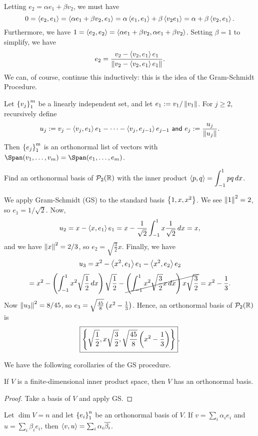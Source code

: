 \documentclass{article}
\begin{document}
Letting $e_2 =\alpha e_1+\beta v_2$, we must have
$$0 = \left\langle e_2, e_1\right\rangle = \left\langle\alpha e_1 + \beta v_2, e_1\right\rangle = \alpha\left\langle e_1, e_1\right\rangle + \beta\left\langle v_2 e_1\right\rangle = \alpha + \beta\left\langle v_2, e_1\right\rangle.$$
Furthermore, we have $1 = \left\langle e_2, e_2\right\rangle = \left\langle\alpha e_1 + \beta v_2, \alpha e_1 + \beta v_2\right\rangle$. Setting $\beta = 1$ to simplify, we have
$$e_2 = \frac{v_2 - \left\langle v_2, e_1\right\rangle e_1}{\left\Vert v_2 - \left\langle v_2, e_1\right\rangle e_1\right\Vert}.$$
We can, of course, continue this inductively: this is the idea of the Gram-Schmidt Procedure. \newpage
\begin{theorem}
Let $\left\{v_j\right\}_1^m$ be a linearly independent set, and let $e_1 := v_1/\left\Vert v_1\right\Vert$. For $j\geq 2$, recursively define
$$u_j := v_j - \left\langle v_j, e_1\right\rangle e_1 - \cdots - \left\langle v_j, e_{j-1}\right\rangle e_{j-1} \textsf{ and } e_j := \frac{u_j}{\left\Vert u_j\right\Vert}.$$
Then $\left\{e_j\right\}_1^m$ is an orthonormal list of vectors with $\Span(v_1, \ldots, v_m) = \Span(e_1, \ldots, e_m)$.
\end{theorem}
\begin{example}
Find an orthonormal basis of $\mathcal P_2(\mathbb R)$ with the inner product $\left\langle p,q\right\rangle = \displaystyle\int_{-1}^1 pq \,dx$.
\end{example}
\begin{solution}
We apply Gram-Schmidt (GS) to the standard basis $\left\{1, x, x^2\right\}$. We see $\left\Vert 1\right\Vert^2 = 2$, so $e_1 = 1/\sqrt 2$. Now,
$$u_2 = x - \left\langle x, e_1\right\rangle e_1 = x - \frac 1{\sqrt 2}\int_{-1}^1 x\frac 1{\sqrt 2}\, dx = x,$$
and we have $\left\Vert x\right\Vert^2 = 2/3$, so $e_2 = \sqrt{\frac 32}x$. Finally, we have
$$u_3 =x^2 - \left\langle x^2, e_1\right\rangle e_1 - \left\langle x^2, e_2\right\rangle e_2$$
$$=x^2 - \left(\int_{-1}^1 x^2\sqrt{\frac 12}\, dx \right) \sqrt{\frac 12} - \cancel{\left(\int_{-1}^1x^2 \sqrt{\frac 32}x \, dx \right) x\sqrt{\frac 32}} = x^2 - \frac 13.$$
Now $\left\Vert u_3\right\Vert^2 = 8/45$, so $e_3 = \sqrt{\frac{45} 8}\left(x^2 - \frac 13 \right)$. Hence, an orthonormal basis of $\mathcal P_2(\mathbb R)$ is
$$\boxed{\left\{\sqrt{\frac 12}, x\sqrt{\frac 32}, \sqrt{\frac{45}8}\left(x^2 - \frac 13 \right)\right\}}.$$
\end{solution}
We have the following corollaries of the GS procedure.
\begin{corollary}
If $V$ is a finite-dimensional inner product space, then $V$ has an orthonormal basis.
\end{corollary}
\begin{proof}
Take a basis of $V$ and apply GS.
\end{proof}
\begin{corollary}
Let $\dim V = n$ and let $\left\{e_i\right\}_1^n$ be an orthonormal basis of $V$. If $v = \sum_i \alpha_i e_i$ and $u = \sum_i \beta_ie_i$, then $\left\langle v,u\right\rangle = \sum_i\alpha_i\overline{\beta_i}$.
\end{corollary}
\end{document}
